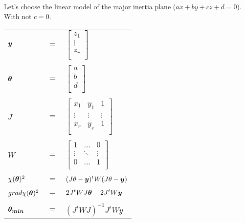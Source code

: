 \documentclass{article}
\newcommand{\bm}[1]{\mbox{\boldmath$#1$}}
\begin{document}
Let's choose the linear model of the major inertia plane
($ax + by + cz + d = 0$). With not $c = 0$.

\begin{tabular}{lcl}
$\bm{y}$ & $=$ & 
$\left[\begin{array}{c}
 z_1 \\
 \vdots \\
 z_r \\
\end{array}\right]$
\\
\\
$\bm{\theta}$ & $=$ &
$\left[\begin{array}{c}
 a \\
 b \\
 d \\
\end{array}\right]$
\\
\\
$J$ & $=$ &
$\left[\begin{array}{ccc}
 x_1    & y_1    & 1 \\
 \vdots & \vdots & \vdots\\
 x_r    & y_r    & 1\\
\end{array}\right]$
\\
\\
$W$ & $=$ &
$\left[\begin{array}{ccc}
 1      & \ldots & 0 \\
 \vdots & \ddots & \vdots\\
 0      & \ldots & 1\\
\end{array}\right]$
\\
\\
$\chi(\bm{\theta})^2$ & $=$ &
$(J\theta - \bm{y})^t W (J\theta - \bm{y})$
\\
\\
$grad \chi(\bm{\theta})^2$ & $=$ &
$2J^tWJ\bm{\theta} - 2J^tW\bm{y}$
\\
\\
$\bm{\theta_{min}}$ & $=$ &
$(J^tWJ)^{-1} J^tWy$
\end{tabular}
\end{document}
